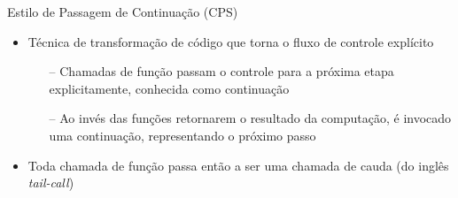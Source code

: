 \begin{frame}{Estilo de Passagem de Continuação (CPS)}
    \begin{itemize}
        \item Técnica de transformação de código que torna o fluxo de controle explícito
              \begin{itemize}
                  \item[--] Chamadas de função passam o controle para a próxima etapa explicitamente, conhecida como continuação~\cite{appel1992compiling}
                  \item[--] Ao invés das funções retornarem o resultado da computação, é invocado uma continuação, representando o próximo passo
              \end{itemize}
        \item Toda chamada de função passa então a ser uma chamada de cauda (do inglês \textit{tail-call})
    \end{itemize}
\end{frame}





